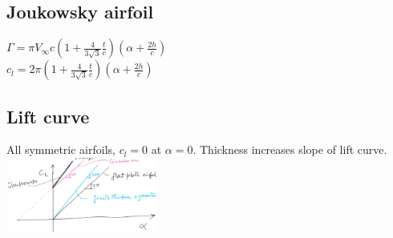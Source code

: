 \subsection*{Joukowsky airfoil}
$\Gamma=\pi V_\infty c\left(1+\frac{4}{3\sqrt{3}}\frac{t}{c}\right)\left(\alpha+\frac{2h}{c}\right)$\\
$c_l=2\pi\left(1+\frac{4}{3\sqrt{3}}\frac{t}{c}\right)\left(\alpha+\frac{2h}{c}\right)$
\subsection*{Lift curve}
All symmetric airfoils, $c_l=0$ at $\alpha=0$. Thickness increases slope of lift curve.\\
\includegraphics[width=140pt]{images/joukowski chart.png}